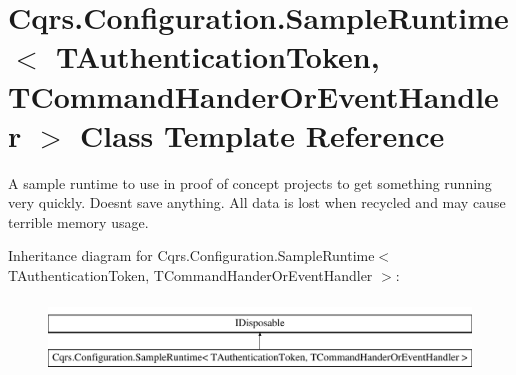 \hypertarget{classCqrs_1_1Configuration_1_1SampleRuntime}{}\section{Cqrs.\+Configuration.\+Sample\+Runtime$<$ T\+Authentication\+Token, T\+Command\+Hander\+Or\+Event\+Handler $>$ Class Template Reference}
\label{classCqrs_1_1Configuration_1_1SampleRuntime}


A sample runtime to use in proof of concept projects to get something running very quickly. Doesn\textquotesingle{}t save anything. All data is lost when recycled and may cause terrible memory usage.  


Inheritance diagram for Cqrs.\+Configuration.\+Sample\+Runtime$<$ T\+Authentication\+Token, T\+Command\+Hander\+Or\+Event\+Handler $>$\+:\begin{figure}[H]
\begin{center}
\leavevmode
\includegraphics[height=1.982301cm]{classCqrs_1_1Configuration_1_1SampleRuntime}
\end{center}
\end{figure}
